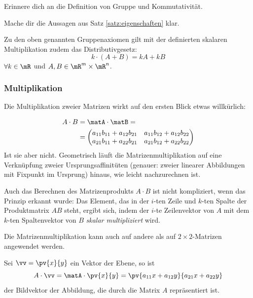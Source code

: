 \documentclass[%
11pt,%
twoside,%
titlepage,%
german,%
headsepline%
]{scrartcl}
\begin{document}
\begin{ueb}
Erinnere dich an die Definition von Gruppe und Kommutativität.
\end{ueb}

\begin{ueb}
Mache dir die Aussagen aus Satz \ref{satz:eigenschaften} klar.
\end{ueb}

\begin{bem}
Zu den oben genannten Gruppenaxiomen gilt mit der definierten skalaren Multiplikation
zudem das Distributivgesetz:
$$k\cdot(A+B)=kA+kB$$
$\forall k\in\mR$ und $A,B\in\mR^m\times\mR^n$.
\end{bem}

\subsubsection{Multiplikation}
Die
Multiplikation zweier Matrizen wirkt auf den ersten Blick etwas willkürlich:

\begin{align*}
A\cdot B&=\matA\cdot\matB=\\
&=
\begin{pmatrix}
a_{11}b_{11}+a_{12}b_{21} & a_{11}b_{12}+a_{12}b_{22}\\
a_{21}b_{11}+a_{22}b_{21} & a_{21}b_{12}+a_{22}b_{22}
\end{pmatrix}
\end{align*}
Ist sie aber nicht. Geometrisch läuft die Matrizenmultiplikation auf eine Verknüpfung zweier Ursprungsaffinitüten (genauer: zweier linearer Abbildungen mit Fixpunkt im Ursprung) hinaus, wie leicht nachzurechnen ist.

Auch das Berechnen des Matrizenprodukts $A\cdot B$ ist nicht kompliziert, wenn das Prinzip erkannt wurde: Das Element, das in der $i$-ten Zeile und $k$-ten Spalte der Produktmatrix $AB$ steht, ergibt sich, indem der $i$-te Zeilenvektor von $A$ mit dem $k$-ten Spaltenvektor von $B$ \emph{skalar multipliziert} wird.

\begin{bem}
Die Matrizenmultiplikation kann auch auf andere als auf $2\times2$-Matrizen angewendet werden.
\end{bem}

\begin{bsp}
Sei $\vv=\pv{x}{y}$ ein Vektor der Ebene, so ist
$$A\cdot\vv=\matA\cdot\pv{x}{y}=\pv{a_{11}x+a_{12}y}{a_{21}x+a_{22}y}$$
der Bildvektor der Abbildung, die durch die Matrix $A$ repräsentiert ist.
\end{bsp}
\end{document}
